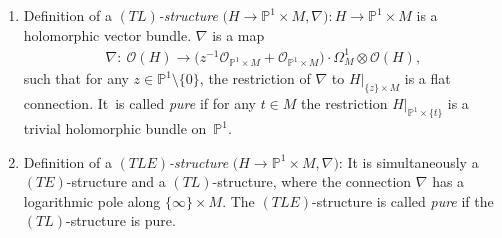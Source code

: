 \documentclass[pdftex]{sigma}%
\numberwithin{equation}{section}
\numberwithin{figure}{section}
\renewcommand{\P}{{\mathbb P}}
\newcommand{\OO}{{\mathcal O}}
\begin{document}
\begin{Definition}
\begin{enumerate}
\item[$(c)$] Definition of a {\it $(TL)$-structure} $\big(H\to\P^1\times M,\nabla\big)\colon
H\to\P^1\times M$ is a holomorphic vector bundle.
$\nabla$ is a map\vspace{-.5ex}
\begin{gather*}%
\nabla\colon\ \OO(H)\to \big(z^{-1}\OO_{\P^1\times M}+\OO_{\P^1\times M}\big)
\cdot \Omega^1_M\otimes \OO(H),
\end{gather*}
such that for any $z\in\P^1\setminus\{0\}$, the restriction
of $\nabla$ to $H|_{\{z\}\times M}$ is a flat connection. It~is called {\it pure} if for any $t\in M$ the restriction
$H|_{\P^1\times\{t\}}$ is a trivial holomorphic bundle on~$\P^1$.

\item[$(d)$] Definition of a {\it $(TLE)$-structure}
$\big(H\to\P^1\times M,\nabla\big)$:
It is simultaneously a $(TE)$-structure and a
$(TL)$-structure, where the connection $\nabla$
has a logarithmic pole along $\{\infty\}\times M$.
The $(TLE)$-structure is called {\it pure} if the
$(TL)$-structure is pure.
\end{enumerate}
\end{Definition}
\end{document}
